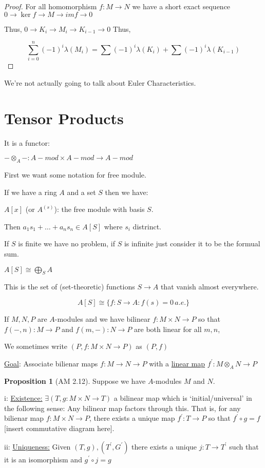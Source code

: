 \documentclass{article}
\theoremstyle{definition}
\newtheorem{proposition}{Proposition}
\begin{document}
\begin{proof}
    For all homomorphism \(f: M \to N\) we have a short exact sequence \(0\to \ker f \to M \to im f \to 0\) 

    Thus, \(0 \to K_i \to M_i \to K_{i-1} \to 0 \) Thus,

    \[
        \sum_{i=0}^{n} (-1)^i \lambda (M_i) = \sum (-1)^i \lambda (K_i) + \sum (-1)^i \lambda(K_{i-1})
    \]

\end{proof}

We're not actually going to talk about Euler Characteristics.

\section*{Tensor Products}

It is a functor:

\(- \otimes_A - : A-mod \times A-mod \to A-mod\) 

First we want some notation for free module.

If we have a ring \(A\) and a set \(S\) then we have:

\(A[x]\) (or \(A^{(s)}\)): the free module with basis \(S\).

Then \(a_1 s_1 + \dots + a_n s_n \in A[S]\) where \(s_i\) distrinct.

If \(S\) is finite we have no problem, if \(S\) is infinite just consider it to be the formual sum.

\(A[S] \cong \bigoplus_{S}^{} A\) 

This is the set of (set-theoretic) functions \(S \to A\) that vanish almost everywhere.

\[
    A[S] \cong \{ f : S \to A : f(s)=0 \,a.e. \} 
\]

If \(M,N,P\) are \(A\)-modules and we have bilinear \(f: M\times N \to P\) so that \(f(-,n):M\to P\) and \(f(m,-):N\to P\) are both linear for all \(m,n\),

We sometimes write \((P,f:M\times N \to P)\) as \((P,f)\) 

\underline{Goal}: Associate bilienar maps \(f:M\to N\to P\) with a \underline{linear map} \(f^{\prime} : M \otimes _A N \to P\) 

\begin{proposition}
    [AM 2.12] Suppose we have \(A\)-modules \(M\) and \(N\).

    i: \underline{Existence:} \(\exists (T, g: M\times N \to T)\) a bilinear map which is `initial/universal' in the following sense: Any bilinear map factors through this. That is, for any bilienar map \(f: M\times N \to P\), there exists a unique map \(f^{\prime} : T\to P\) so that \(f^{\prime} \circ g = f\) [insert commutative diagram here].

    ii: \underline{Uniqueness:} Given \((T,g),(T^{\prime} ,G^{\prime} )\) there exists a unique \(j:T \to T^{\prime} \) such that it is an isomorphism and \(g^{\prime} \circ j = g\) 

\end{proposition}
\end{document}
